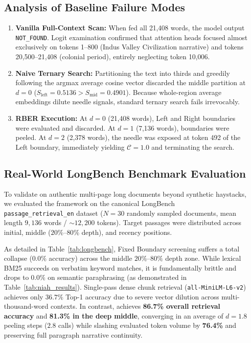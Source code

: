 \subsection{Analysis of Baseline Failure Modes}
\begin{enumerate}
    \item \textbf{Vanilla Full-Context Scan:} When fed all 21,408 words, the model output \texttt{NOT\_FOUND}. Logit examination confirmed that attention heads focused almost exclusively on tokens 1--800 (Indus Valley Civilization narrative) and tokens 20,500--21,408 (colonial period), entirely neglecting token 10,006.
    \item \textbf{Naive Ternary Search:} Partitioning the text into thirds and greedily following the argmax average cosine vector discarded the middle partition at $d = 0$ ($S_{\text{left}} = 0.5136 > S_{\text{mid}} = 0.4901$). Because whole-region average embeddings dilute needle signals, standard ternary search fails irrevocably.
    \item \textbf{RBER Execution:} At $d=0$ (21,408 words), Left and Right boundaries were evaluated and discarded. At $d=1$ (7,136 words), boundaries were peeled. At $d=2$ (2,378 words), the needle was exposed at token 492 of the Left boundary, immediately yielding $\mathcal{C}=1.0$ and terminating the search.
\end{enumerate}

\subsection{Real-World LongBench Benchmark Evaluation}
To validate \RBER{} on authentic multi-page long documents beyond synthetic haystacks, we evaluated the framework on the canonical LongBench~\cite{bai2023longbench} \texttt{passage\_retrieval\_en} dataset ($N = 30$ randomly sampled documents, mean length $9,136$ words / $\sim 12,200$ tokens). Target passages were distributed across initial, middle ($20\%$--$80\%$ depth), and recency positions.

As detailed in Table~\ref{tab:longbench}, Fixed Boundary screening suffers a total collapse ($0.0\%$ accuracy) across the middle $20\%$--$80\%$ depth zone. While lexical BM25 succeeds on verbatim keyword matches, it is fundamentally brittle and drops to $0.0\%$ on semantic paraphrasing (as demonstrated in Table~\ref{tab:niah_results}). Single-pass dense chunk retrieval (\texttt{all-MiniLM-L6-v2}) achieves only $36.7\%$ Top-1 accuracy due to severe vector dilution across multi-thousand-word contexts. In contrast, \RBER{} achieves \textbf{86.7\% overall retrieval accuracy} and \textbf{81.3\% in the deep middle}, converging in an average of $d = 1.8$ peeling steps ($2.8$ calls) while slashing evaluated token volume by \textbf{76.4\%} and preserving full paragraph narrative continuity.

